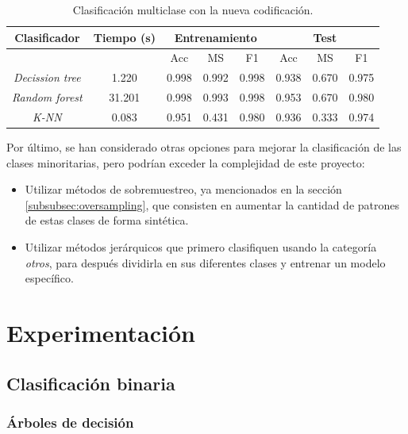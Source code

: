 \begin{table}[th]
	\centering
	\begin{tabular}{ |c|c|c|c|c|c|c|c| }
		\hline
		\rowcolor{LightCyan}
		Clasificador & Tiempo (s) & \multicolumn{3}{c|}{Entrenamiento} & \multicolumn{3}{c|}{Test} \\
		\hline
		\rowcolor{LightCyan}
		&            & Acc & MS & F1 & Acc & MS & F1 \\
		\hline
		\textit{Decission tree} & 1.220  & 0.998 & 0.992 & 0.998 & 0.938 & 0.670 & 0.975 \\
		\textit{Random forest}  & 31.201 & 0.998 & 0.993 & 0.998 & 0.953 & 0.670 & 0.980 \\
		\textit{K-NN}           & 0.083  & 0.951 & 0.431 & 0.980 & 0.936 & 0.333 & 0.974 \\
		\hline
	\end{tabular}
	\caption{Clasificación multiclase con la nueva codificación.}
	\label{tabla:multi_new}
\end{table}


\vspace{1em}

Por último, se han considerado otras opciones para mejorar la clasificación de las clases minoritarias, pero podrían exceder la complejidad de este proyecto:

\begin{itemize}
	\item Utilizar métodos de sobremuestreo, ya mencionados en la sección \ref{subsubsec:oversampling}, que consisten en aumentar la cantidad de patrones de estas clases de forma sintética.
	\item Utilizar métodos jerárquicos que primero clasifiquen usando la categoría \textit{otros}, para después dividirla en sus diferentes clases y entrenar un modelo específico.
\end{itemize}

\section{Experimentación}
\label{sec:exp}

\subsection{Clasificación binaria}
\label{sec:clas_binaria}

\subsubsection{Árboles de decisión}
\label{sec:dec_tree}


